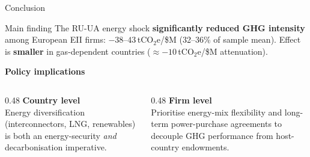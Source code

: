 \documentclass[10pt]{beamer}
\begin{document}
\begin{frame}{Conclusion}
  \begin{block}{Main finding}
    The RU-UA energy shock \textbf{significantly reduced GHG intensity} among European EII firms:
    $-38$--$43$\,tCO$_2$e/\$M (32--36\% of sample mean).
    Effect is \textbf{smaller} in gas-dependent countries ($\approx -10$\,tCO$_2$e/\$M attenuation).
  \end{block}

  \vspace{0.5em}

  \textbf{Policy implications}

  \begin{columns}[T]
    \begin{column}{0.48\textwidth}
      \textbf{Country level}\\[0.2em]
      {\small Energy diversification (interconnectors, LNG, renewables) is both an energy-security
      \emph{and} decarbonisation imperative.}
    \end{column}
    \begin{column}{0.48\textwidth}
      \textbf{Firm level}\\[0.2em]
      {\small Prioritise energy-mix flexibility and long-term power-purchase agreements
      to decouple GHG performance from host-country endowments.}
    \end{column}
  \end{columns}

\end{frame}
\end{document}
